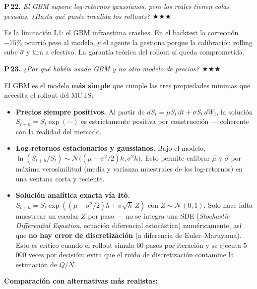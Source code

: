 \documentclass[11pt,a4paper]{article}
\newcommand{\preg}[2]{%
  \par\medskip
  \noindent\textbf{P\,#1.} \emph{#2}\par\smallskip}
\newcommand{\resp}[1]{%
  \noindent #1\par}
\begin{document}
\preg{22}{El GBM supone log-retornos gaussianos, pero los reales tienen
colas pesadas. ¿Hasta qué punto invalida los rollouts?
\hfill$\bigstar\bigstar\bigstar$}
\resp{%
Es la limitación L1: el GBM infraestima crashes. En el backtest la
corrección $-75\%$ ocurrió pese al modelo, y el agente la gestiona porque
la calibración rolling sube $\hat\sigma$ y tira a efectivo. La garantía
teórica del rollout sí queda comprometida.}

\preg{23}{¿Por qué habéis usado GBM y no otro modelo de precios?
\hfill$\bigstar\bigstar\bigstar$}
\resp{%
El GBM es el modelo \textbf{más simple} que cumple las tres propiedades
mínimas que necesita el rollout del MCTS:

\begin{itemize}\setlength{\itemsep}{0pt}
  \item \textbf{Precios siempre positivos.} Al partir de
        $dS_t = \mu S_t\,dt + \sigma S_t\,dW_t$, la solución
        $S_{t+h}=S_t\exp(\cdots)$ es estrictamente positiva por
        construcción --- coherente con la realidad del mercado.
  \item \textbf{Log-retornos estacionarios y gaussianos.}
        Bajo el modelo, $\ln(S_{t+h}/S_t)\sim
        \mathcal{N}\bigl((\mu-\sigma^2/2)h,\sigma^2 h\bigr)$. Esto
        permite calibrar $\hat\mu$ y $\hat\sigma$ por máxima
        verosimilitud (media y varianza muestrales de los log-retornos)
        en una ventana corta y reciente.
  \item \textbf{Solución analítica exacta vía Itô.}
        $S_{t+h}=S_t\exp((\mu-\sigma^2/2)h+\sigma\sqrt h\,Z)$ con
        $Z\sim\mathcal N(0,1)$. Solo hace falta muestrear un escalar
        $Z$ por paso --- no se integra una SDE (\emph{Stochastic
        Differential Equation}, ecuación diferencial estocástica)
        numéricamente, así que
        \textbf{no hay error de discretización} (a diferencia de
        Euler--Maruyama). Esto es crítico cuando el rollout simula 60
        pasos por iteración y se ejecuta 5\,000 veces por decisión:
        evita que el ruido de discretización contamine la estimación de
        $Q/N$.
\end{itemize}

\smallskip
\textbf{Comparación con alternativas más realistas:}

}
\end{document}
